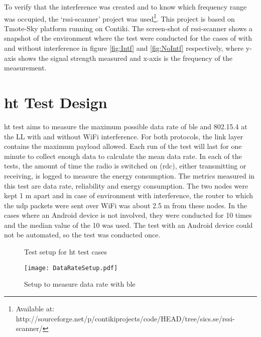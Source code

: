 To verify that the interference was created and to know which frequency range was occupied, the `rssi-scanner' project was used\footnote{Available at: http://sourceforge.net/p/contikiprojects/code/HEAD/tree/sics.se/rssi-scanner/}. This project is based on Tmote-Sky platform running on Contiki. The screen-shot of rssi-scanner shows a snapshot of the environment where the test were conducted for the cases of with and without interference in figure \ref{fig:Intf} and \ref{fig:NoIntf} respectively, where y-axis shows the signal strength measured and x-axis is the frequency of the measurement.



\section{\acrfull{ht} Test Design} \label{6HTdesign}
\gls{ht} test aims to measure the maximum possible data rate of \gls{ble} and 802.15.4 at the LL with and without WiFi interference. For both protocols, the link layer contains the maximum payload allowed. Each run of the test will last for one minute to collect enough data to calculate the mean data rate. In each of the tests, the amount of time the radio is switched on (\gls{rdc}), either transmitting or receiving, is logged to measure the energy consumption. The metrics measured in this test are data rate, reliability and energy consumption. The two nodes were kept 1 m apart and in case of environment with interference, the router to which the \gls{udp} packets were sent over WiFi was about 2.5 m from these nodes. In the cases where an Android device is not involved, they were conducted for 10 times and the median value of the 10 was used. The test with an Android device could not be automated, so the test was conducted once.

\begin{figure}[h]
\def\svgwidth{\columnwidth}

\caption{Test setup for \gls{ht} test cases}
\label{fig:layout}
\end{figure}

\begin{wrapfigure}{r}{0.53\textwidth}
	\vspace{-20pt}
	\centering
	\capstart
	\texttt{[image: DataRateSetup.pdf]}
	\caption{Setup to measure data rate with \gls{ble}}
    \label{fig:DataRateSetup}
\end{wrapfigure}

